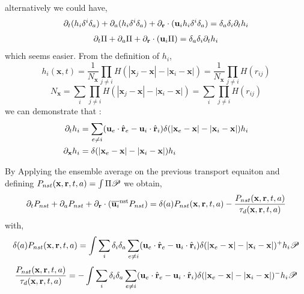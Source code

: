 alternatively we could have, 
\begin{align*}
    \partial_t (h_i \delta^i \delta_a) 
    + \partial_a (h_i \delta^i \delta_a) 
    + \partial_\textbf{r}\cdot  ( \textbf{u}_i h_i \delta^i\delta_a) 
    &= \delta_a \delta_i \partial_t h_i\\
\end{align*}
\begin{align*}
    \partial_t \Pi
    + \partial_a \Pi
    + \partial_\textbf{r}\cdot  ( \textbf{u}_i \Pi) 
    &= \delta_a \delta_i \partial_t h_i\\
\end{align*}
which seems easier. 
From the definition of $h_i$,
\begin{equation*}
    h_{i}(\textbf{x},t) 
    = \frac{1}{N_\textbf{x}}
    \prod_{j \neq i}
    H(|\textbf{x}_j - \textbf{x}| - |\textbf{x}_i - \textbf{x}|)
    = \frac{1}{N_\textbf{x}}
    \prod_{j \neq i}
    H(r_{ij})
\end{equation*}
\begin{equation*}
    N_\textbf{x}
    = 
    \sum_{i}
    \prod_{j\neq i}
    H(|\textbf{x}_j - \textbf{x}| - |\textbf{x}_i - \textbf{x}|)
    = 
    \sum_{i}
    \prod_{j\neq i}
    H(r_{ij})
\end{equation*}
 we can demonstrate that : 
\begin{align*}
    \partial_t h_i
    &=
    \sum_{e \neq i} (\textbf{u}_e \cdot \hat{\textbf{r}}_e - \textbf{u}_i \cdot \hat{\textbf{r}}_i)
    \delta(|\textbf{x}_e - \textbf{x}| - |\textbf{x}_i - \textbf{x}|) h_i\\
    \partial_\textbf{x} h_i
    &= \delta(|\textbf{x}_e - \textbf{x}| - |\textbf{x}_i - \textbf{x}|) h_i
\end{align*}

By Applying the ensemble average on the previous transport equaiton and defining $P_{nst}(\textbf{x},\textbf{r},t,a) = \int \Pi \mathscr{P}$ we obtain,
\begin{align*}
    \partial_t P_{nst}
    + \partial_a P_{nst}
    + \partial_\textbf{r}\cdot  ( \overline{\textbf{u}_i}^\text{nst} P_{nst}) 
    &= \delta(a)P_{nst}(\textbf{x},\textbf{r},t,a) - \frac{P_{nst}(\textbf{x},\textbf{r},t,a)}
    {\tau_d(\textbf{x},\textbf{r},t,a)}\\
\end{align*} 
with, 
\begin{equation}
    \delta(a)P_{nst}(\textbf{x},\textbf{r},t,a)
    = 
    \int
    \sum_i \delta_i \delta_a \sum_{e \neq i} (\textbf{u}_e \cdot \hat{\textbf{r}}_e - \textbf{u}_i \cdot \hat{\textbf{r}}_i)
    \delta(|\textbf{x}_e - \textbf{x}| - |\textbf{x}_i - \textbf{x}|)^+ h_i
    \mathscr{P}
\end{equation}
\begin{equation}
    \frac{P_{nst}(\textbf{x},\textbf{r},t,a)}
    {\tau_d(\textbf{x},\textbf{r},t,a)}
    = 
    -\int
    \sum_i \delta_i \delta_a \sum_{e \neq i} (\textbf{u}_e \cdot \hat{\textbf{r}}_e - \textbf{u}_i \cdot \hat{\textbf{r}}_i)
    \delta(|\textbf{x}_e - \textbf{x}| - |\textbf{x}_i - \textbf{x}|)^- h_i
    \mathscr{P}
\end{equation}
